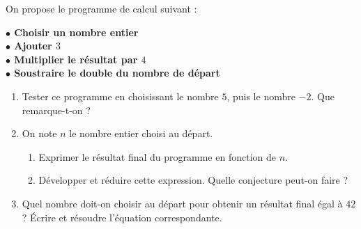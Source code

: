 \documentclass[a4paper]{book}
\begin{document}
    
    \begin{exercice}
        On propose le programme de calcul suivant :
        \begin{center}
            \begin{tcolorbox}[colback=gray!5, colframe=gray!40, width=8cm, arc=1mm, center]
            \bfseries
            $\bullet$ Choisir un nombre entier \\
            $\bullet$ Ajouter $3$ \\
            $\bullet$ Multiplier le résultat par $4$ \\
            $\bullet$ Soustraire le double du nombre de départ
            \end{tcolorbox}
        \end{center}
        
        \begin{enumerate}
            \item Tester ce programme en choisissant le nombre $5$, puis le nombre $-2$. Que remarque-t-on ?
            \item On note $n$ le nombre entier choisi au départ. 
            \begin{enumerate}
                \item Exprimer le résultat final du programme en fonction de $n$.
                \item Développer et réduire cette expression. Quelle conjecture peut-on faire ?
            \end{enumerate}
            \item Quel nombre doit-on choisir au départ pour obtenir un résultat final égal à $42$ ? Écrire et résoudre l'équation correspondante.
        \end{enumerate}
    \end{exercice}
\end{document}
